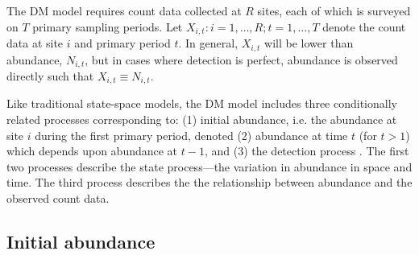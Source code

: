 \documentclass[12pt,english]{article}
\begin{document}
\begin{spacing}{1.9}
\begin{flushleft}

The DM model requires count data collected at $R$ sites, each of
which is surveyed on $T$ primary sampling periods. 
Let $X_{i,t}: i=1,\hdots,R; t=1,\hdots,T$ denote the count data
at site $i$ and primary period $t$. 
In general, $X_{i,t}$ will be lower than abundance, 
$N_{i,t}$, but in cases where detection is perfect,
abundance is observed directly such that $X_{i,t} \equiv N_{i,t}$.


Like traditional state-space models, the DM model includes 
three conditionally related processes corresponding to: 
(1) initial abundance, i.e. the
abundance at site $i$ during the first primary period,
denoted (2) abundance at time $t$ (for $t>1$) which depends upon
abundance at $t-1$, and (3) the
detection process \citep{dail_madsen:2011}.
The first two processes describe the state process---the
variation in abundance in space and time. The third process %
describes the the relationship between
abundance and the observed count data.

\subsection*{Initial abundance}


\end{flushleft}
\end{spacing}
\end{document}
